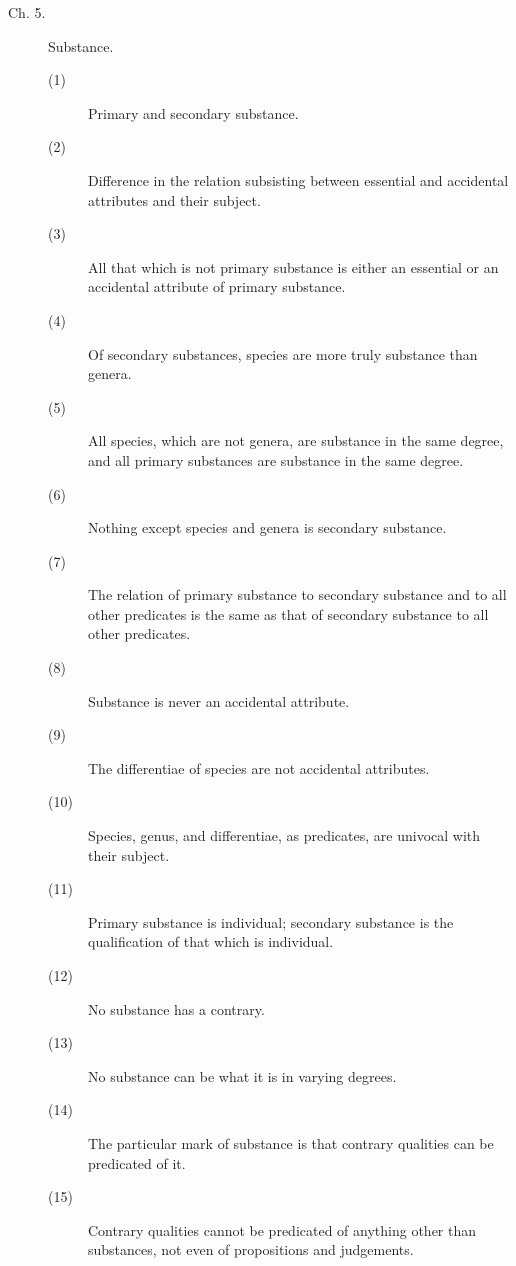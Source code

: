 \begin{description}
\item[Ch. 5.] Substance. 
\begin{description}
\item[(1)] Primary and secondary substance. 
\item[(2)] Difference in the relation subsisting between essential and accidental attributes and their subject.
\item[(3)] All that which is not primary substance is either an essential or an accidental attribute of primary substance.
\item[(4)] Of secondary substances, species are more truly substance than genera. 
\item[(5)] All species, which are not genera, are substance in the same degree, and all primary substances are substance in the same degree. 
\item[(6)] Nothing except species and genera is secondary substance. 
\item[(7)] The relation of primary substance to secondary substance and to all other predicates is the same as that of secondary substance to all other predicates. 
\item[(8)] Substance is never an accidental attribute. 
\item[(9)] The differentiae of species are not accidental attributes. 
\item[(10)] Species, genus, and differentiae, as predicates, are univocal with their subject. 
\item[(11)] Primary substance is individual; secondary substance is the qualification of that which is individual. 
\item[(12)] No substance has a contrary. 
\item[(13)] No substance can be what it is in varying degrees. 
\item[(14)] The particular mark of substance is that contrary qualities can be predicated of it. 
\item[(15)] Contrary qualities cannot be predicated of anything other than substances, not even of propositions and judgements. 
\end{description}


\end{description}
